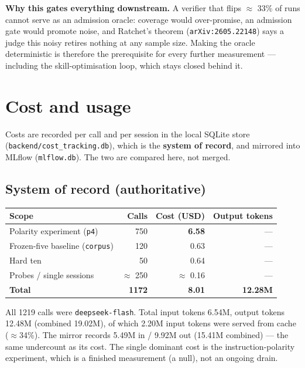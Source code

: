 \documentclass[11pt,a4paper]{article}
\begin{document}
\begin{notebox}[colframe=warn]
\textbf{Why this gates everything downstream.} A verifier that flips $\approx$ 33\% of
runs cannot serve as an admission oracle: coverage would over-promise, an admission
gate would promote noise, and Ratchet's theorem (\texttt{arXiv:2605.22148}) says a
judge this noisy retires nothing at any sample size. Making the oracle deterministic
is therefore the prerequisite for every further measurement --- including the
skill-optimisation loop, which stays closed behind it.
\end{notebox}

\section{Cost and usage}
\label{sec:cost}

Costs are recorded per call and per session in the local SQLite store
(\texttt{backend/cost\_tracking.db}), which is the \textbf{system of record}, and
mirrored into MLflow (\texttt{mlflow.db}). The two are compared here, not merged.

\subsection{System of record (authoritative)}

\begin{center}
\begin{tabular}{@{}lrrr@{}}
\toprule
\textbf{Scope} & \textbf{Calls} & \textbf{Cost (USD)} & \textbf{Output tokens} \\
\midrule
Polarity experiment (\texttt{p4}) & 750 & \textbf{6.58} & --- \\
Frozen-five baseline (\texttt{corpus}) & 120 & 0.63 & --- \\
Hard ten & 50 & 0.64 & --- \\
Probes / single sessions & $\approx$ 250 & $\approx$ 0.16 & --- \\
\midrule
\textbf{Total} & \textbf{1172} & \textbf{8.01} & \textbf{12.28M} \\
\bottomrule
\end{tabular}
\end{center}

All 1219 calls were \texttt{deepseek-flash}. Total input tokens 6.54M, output tokens
12.48M (combined 19.02M), of which 2.20M input tokens were served from cache
($\approx$34\%). The mirror records 5.49M in / 9.92M out (15.41M combined) --- the
same undercount as its cost. The single dominant cost is the instruction-polarity
experiment, which is a finished measurement (a null), not an ongoing drain.
\end{document}
